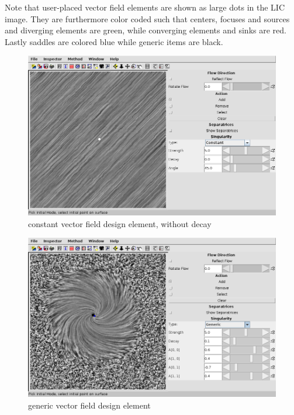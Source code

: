 \documentclass[a4paper,10pt,notitlepage]{scrartcl}
\begin{document}
Note that user-placed vector field elements are shown as large dots in the LIC
image. They are furthermore color coded such that centers, focuses and sources
and diverging elements are green, while converging elements and sinks are red.
Lastly saddles are colored blue while generic items are black.

\begin{figure}
  \centering
  \includegraphics[scale=0.5]{img-3-2/constant.png}
  \caption{constant vector field design element, without decay}
  \label{fig:constant}
\end{figure}

\begin{figure}
  \centering
  \includegraphics[scale=0.5]{img-3-2/generic.png}
  \caption{generic vector field design element}
  \label{fig:generic}
\end{figure}
\end{document}
